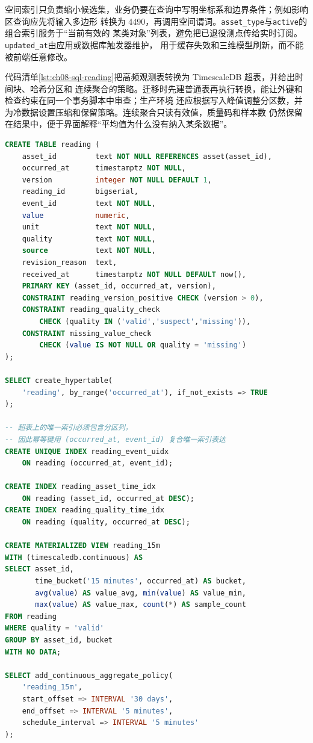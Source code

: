 空间索引只负责缩小候选集，业务仍要在查询中写明坐标系和边界条件；例如影响区查询应先将输入多边形
转换为 4490，再调用空间谓词。\texttt{asset\_type}与\texttt{active}的组合索引服务于“当前有效的
某类对象”列表，避免把已退役测点传给实时订阅。\texttt{updated\_at}由应用或数据库触发器维护，
用于缓存失效和三维模型刷新，而不能被前端任意修改。

代码清单\ref{lst:ch08-sql-reading}把高频观测表转换为 TimescaleDB 超表，并给出时间块、哈希分区和
连续聚合的策略。迁移时先建普通表再执行转换，能让外键和检查约束在同一个事务脚本中审查；生产环境
还应根据写入峰值调整分区数，并为冷数据设置压缩和保留策略。连续聚合只读有效值，质量码和样本数
仍然保留在结果中，便于界面解释“平均值为什么没有纳入某条数据”。

\begin{lstlisting}[label={lst:ch08-sql-reading},language=SQL,caption={时序观测表、分区与连续聚合 DDL}]
CREATE TABLE reading (
    asset_id         text NOT NULL REFERENCES asset(asset_id),
    occurred_at      timestamptz NOT NULL,
    version          integer NOT NULL DEFAULT 1,
    reading_id       bigserial,
    event_id         text NOT NULL,
    value            numeric,
    unit             text NOT NULL,
    quality          text NOT NULL,
    source           text NOT NULL,
    revision_reason  text,
    received_at      timestamptz NOT NULL DEFAULT now(),
    PRIMARY KEY (asset_id, occurred_at, version),
    CONSTRAINT reading_version_positive CHECK (version > 0),
    CONSTRAINT reading_quality_check
        CHECK (quality IN ('valid','suspect','missing')),
    CONSTRAINT missing_value_check
        CHECK (value IS NOT NULL OR quality = 'missing')
);

SELECT create_hypertable(
    'reading', by_range('occurred_at'), if_not_exists => TRUE
);

-- 超表上的唯一索引必须包含分区列，
-- 因此幂等键用 (occurred_at, event_id) 复合唯一索引表达
CREATE UNIQUE INDEX reading_event_uidx
    ON reading (occurred_at, event_id);

CREATE INDEX reading_asset_time_idx
    ON reading (asset_id, occurred_at DESC);
CREATE INDEX reading_quality_time_idx
    ON reading (quality, occurred_at DESC);

CREATE MATERIALIZED VIEW reading_15m
WITH (timescaledb.continuous) AS
SELECT asset_id,
       time_bucket('15 minutes', occurred_at) AS bucket,
       avg(value) AS value_avg, min(value) AS value_min,
       max(value) AS value_max, count(*) AS sample_count
FROM reading
WHERE quality = 'valid'
GROUP BY asset_id, bucket
WITH NO DATA;

SELECT add_continuous_aggregate_policy(
    'reading_15m',
    start_offset => INTERVAL '30 days',
    end_offset => INTERVAL '5 minutes',
    schedule_interval => INTERVAL '5 minutes'
);
\end{lstlisting}

